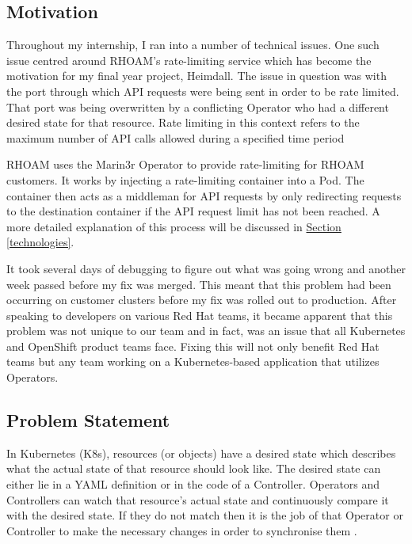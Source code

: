 \documentclass{article}
\begin{document}
\subsection{Motivation} 
Throughout my internship, I ran into a number of technical issues. One such issue centred around RHOAM's rate-limiting service which has become the motivation for my final year project, Heimdall. The issue in question was with the port through which API requests were being sent in order to be rate limited. That port was being overwritten by a conflicting Operator who had a different desired state for that resource. Rate limiting in this context refers to the maximum number of API calls allowed during a specified time period \cite{understanding-apis} \\\par RHOAM uses the Marin3r Operator to provide rate-limiting for RHOAM customers. It works by injecting a rate-limiting container into a Pod. The container then acts as a middleman for API requests by only redirecting requests to the destination container if the API request limit has not been reached. A more detailed explanation of this process will be discussed in \hyperlink{technologies}{Section \ref{technologies}}. \\\par It took several days of debugging to figure out what was going wrong and another week passed before my fix was merged. This meant that this problem had been occurring on customer clusters before my fix was rolled out to production. After speaking to developers on various Red Hat teams, it became apparent that this problem was not unique to our team and in fact, was an issue that all Kubernetes and OpenShift product teams face. Fixing this will not only benefit Red Hat teams but any team working on a Kubernetes-based application that utilizes Operators.


\newpage
\subsection{Problem Statement} \label{problem-statement}
In Kubernetes (K8s), resources (or objects) have a desired state which describes what the actual state of that resource should look like. The desired state can either lie in a YAML definition or in the code of a Controller. Operators and Controllers can watch that resource's actual state and continuously compare it with the desired state. If they do not match then it is the job of that Operator or Controller to make the necessary changes in order to synchronise them \cite{operator-pattern}.
\end{document}
